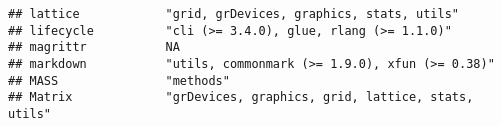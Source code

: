 \documentclass[
]{article}
\begin{document}
\begin{verbatim}
## lattice            "grid, grDevices, graphics, stats, utils"                                                                                                                                                                                                                                                                                                                                                                                                    
## lifecycle          "cli (>= 3.4.0), glue, rlang (>= 1.1.0)"                                                                                                                                                                                                                                                                                                                                                                                                     
## magrittr           NA                                                                                                                                                                                                                                                                                                                                                                                                                                           
## markdown           "utils, commonmark (>= 1.9.0), xfun (>= 0.38)"                                                                                                                                                                                                                                                                                                                                                                                               
## MASS               "methods"                                                                                                                                                                                                                                                                                                                                                                                                                                    
## Matrix             "grDevices, graphics, grid, lattice, stats, utils"                                                                                                                                                                                                                                                                                                                                                                                           

\end{verbatim}
\end{document}
